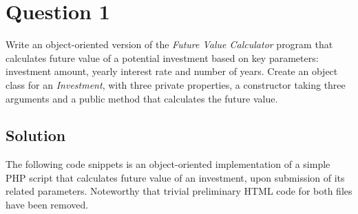 
\section*{Question 1}

Write an object-oriented version of the \textit{Future Value Calculator} program that calculates future value of a potential investment based on key parameters: investment amount, yearly interest rate and number of years.
Create an object class for an \textit{Investment}, with three private properties, a constructor taking three arguments and a public method that calculates the future value.

\subsection*{Solution}

The following code snippets is an object-oriented implementation of a simple PHP script that calculates future value of an investment, upon submission of its related parameters. Noteworthy that trivial preliminary HTML code for both files have been removed.

